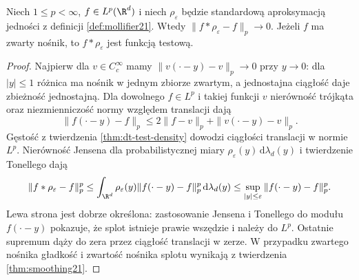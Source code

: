 \begin{twierdzenie}
\label{thm:dt-approx-lp}
Niech $1\le p<\infty$, $f\in L^p(\R^d)$ i niech
$\rho_\varepsilon$ będzie standardową aproksymacją
jedności z definicji \ref{def:mollifier21}.
Wtedy $\|f*\rho_\varepsilon-f\|_p\to0$.
Jeżeli $f$ ma zwarty nośnik, to $f*\rho_\varepsilon$
jest funkcją testową.
\end{twierdzenie}
\begin{proof}
Najpierw dla $v\in C_c^\infty$ mamy
$\|v(\cdot-y)-v\|_p\to0$ przy $y\to0$:
dla $|y|\le1$ różnica ma nośnik w jednym zbiorze
zwartym, a jednostajna ciągłość daje zbieżność
jednostajną. Dla dowolnego $f\in L^p$
i takiej funkcji $v$ nierówność trójkąta
oraz niezmienniczość normy względem translacji dają
\[
 \|f(\cdot-y)-f\|_p\le2\|f-v\|_p+\|v(\cdot-y)-v\|_p.
\]
Gęstość z twierdzenia \ref{thm:dt-test-density}
dowodzi ciągłości translacji w normie $L^p$.
Nierówność Jensena dla probabilistycznej miary
$\rho_\varepsilon(y)\,\mathrm d\lambda_d(y)$
i twierdzenie Tonellego dają
\[
 \|f*\rho_\varepsilon-f\|_p^p
 \le \int_{\R^d}\rho_\varepsilon(y)
            \|f(\cdot-y)-f\|_p^p\,\mathrm d\lambda_d(y)
 \le\sup_{|y|\le\varepsilon}\|f(\cdot-y)-f\|_p^p.
\]
Lewa strona jest dobrze określona: zastosowanie
Jensena i Tonellego do modułu $f(\cdot-y)$
pokazuje, że splot istnieje prawie wszędzie
i należy do $L^p$. Ostatnie supremum dąży do zera
przez ciągłość translacji w zerze.
W przypadku zwartego nośnika gładkość i zwartość
nośnika splotu wynikają z twierdzenia
\ref{thm:smoothing21}.
\end{proof}

